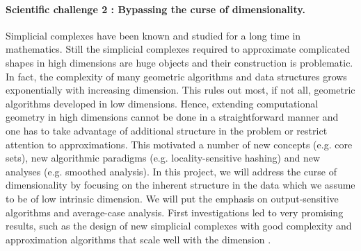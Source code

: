 \paragraph{Scientific challenge 2 :  Bypassing the curse of dimensionality.} 
Simplicial complexes have been known and studied for a long time in mathematics.  Still the simplicial complexes required to approximate complicated shapes in high dimensions are huge objects and their construction is problematic. In fact, the complexity of many geometric algorithms and data structures grows exponentially with increasing dimension. %
This rules out most, if not all, geometric algorithms developed in low dimensions.  Hence, extending computational geometry in high dimensions cannot be done in a straightforward manner and one has to take advantage of additional structure in the problem or restrict attention to approximations. This motivated a number of new concepts (e.g. core sets), new algorithmic paradigms (e.g. locality-sensitive hashing) and new analyses (e.g. smoothed analysis).  In this project, we will address the curse of dimensionality by focusing on the inherent structure in the data which we assume to be of low intrinsic dimension.  We will put the emphasis on output-sensitive algorithms and average-case analysis.  First investigations led to very promising results, such as the design of new simplicial complexes with good complexity and approximation algorithms that scale well with the dimension \cite{geometrica-7142i,cds-tewc-2004}.








